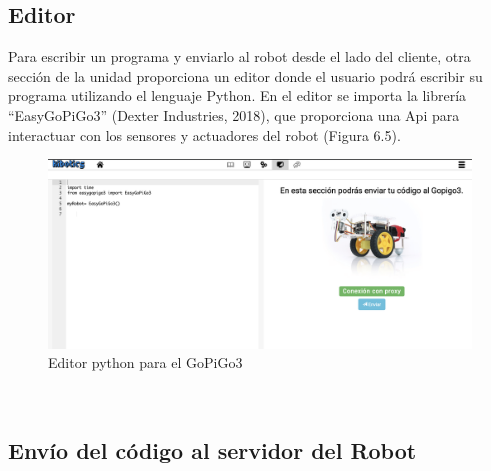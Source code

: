 \documentclass{report}
\begin{document}
\subsection{Editor}

Para escribir un programa y enviarlo al robot desde el lado del cliente, otra sección de la unidad proporciona un editor donde el usuario podrá escribir su programa utilizando el lenguaje Python. En el editor se importa la librería “EasyGoPiGo3” (Dexter Industries, 2018), que proporciona una Api para interactuar con los sensores y actuadores del robot (Figura 6.5).
\\
\begin{figure}[h!]
  \centering
    \includegraphics[width=1\textwidth]{images/editor_GoPiGo.png}
  \caption{Editor python para el GoPiGo3}
  \label{Editor python para el GoPiGo3}
\end{figure}
\\

\subsection{Envío del código al servidor del Robot}
\end{document}
